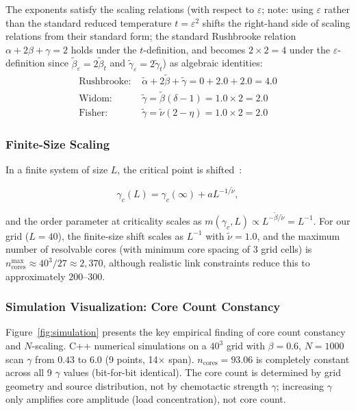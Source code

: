 \documentclass[sn-nature,pdflatex]{sn-jnl}
\begin{document}
The exponents satisfy the scaling relations (with respect to $\varepsilon$; note: using $\varepsilon$ rather than the standard reduced temperature $t = \varepsilon^2$ shifts the right-hand side of scaling relations from their standard form; the standard Rushbrooke relation $\alpha + 2\beta + \gamma = 2$ holds under the $t$-definition, and becomes $2 \times 2 = 4$ under the $\varepsilon$-definition since $\tilde{\beta}_\varepsilon = 2\tilde{\beta}_t$ and $\tilde{\gamma}_\varepsilon = 2\tilde{\gamma}_t$) as algebraic identities:
\begin{align}
\text{Rushbrooke: } &\tilde{\alpha} + 2\tilde{\beta} + \tilde{\gamma} = 0 + 2.0 + 2.0 = 4.0 \\
\text{Widom: } &\tilde{\gamma} = \tilde{\beta}(\delta - 1) = 1.0 \times 2 = 2.0 \\
\text{Fisher: } &\tilde{\gamma} = \tilde{\nu}(2 - \eta) = 1.0 \times 2 = 2.0
\end{align}

\subsubsection{Finite-Size Scaling}

In a finite system of size $L$, the critical point is shifted~\cite{binder_1981}:

\begin{equation}
\gamma_c(L) = \gamma_c(\infty) + a L^{-1/\tilde{\nu}},
\end{equation}

and the order parameter at criticality scales as $m(\gamma_c, L) \propto L^{-\tilde{\beta}/\tilde{\nu}} = L^{-1}$.
For our grid ($L = 40$), the finite-size shift scales as $L^{-1}$ with $\tilde{\nu}=1.0$, and the maximum number of resolvable cores (with minimum core spacing of 3 grid cells) is $n_{\text{cores}}^{\max} \approx 40^3 / 27 \approx 2,370$, although realistic link constraints reduce this to approximately $200$--$300$.

\subsubsection{Simulation Visualization: Core Count Constancy}

Figure~\ref{fig:simulation} presents the key empirical finding of core count constancy and $N$-scaling.
C++ numerical simulations on a $40^3$ grid with $\beta=0.6$, $N=1000$ scan $\gamma$ from $0.43$ to $6.0$ (9 points, 14$\times$ span). $n_{\text{cores}} = 93.06$ is completely constant across all 9 $\gamma$ values (bit-for-bit identical).
The core count is determined by grid geometry and source distribution, not by chemotactic strength $\gamma$; increasing $\gamma$ only amplifies core amplitude (load concentration), not core count.
\end{document}
